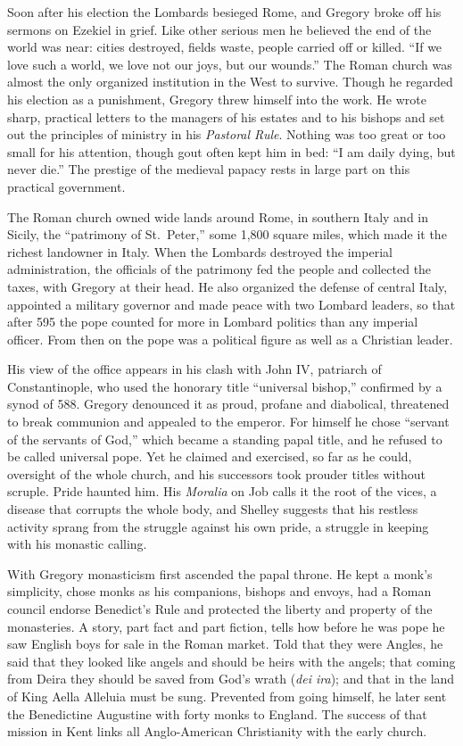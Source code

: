 Soon after his election the Lombards besieged Rome, and Gregory broke off his sermons on Ezekiel in
grief. Like other serious men he believed the end of the world was near: cities destroyed, fields
waste, people carried off or killed. ``If we love such a world, we love not our joys, but our
wounds.'' The Roman church was almost the only organized institution in the West to survive. Though he
regarded his election as a punishment, Gregory threw himself into the work. He wrote sharp, practical
letters to the managers of his estates and to his bishops and set out the principles of ministry in
his \emph{Pastoral Rule}. Nothing was too great or too small for his attention, though gout often
kept him in bed: ``I am daily dying, but never die.'' The prestige of the medieval papacy rests in
large part on this practical government.

The Roman church owned wide lands around Rome, in southern Italy and in Sicily, the ``patrimony of
St.~Peter,'' some 1,800 square miles, which made it the richest landowner in Italy. When the Lombards
destroyed the imperial administration, the officials of the patrimony fed the people and collected
the taxes, with Gregory at their head. He also organized the defense of central Italy, appointed a
military governor and made peace with two Lombard leaders, so that after 595 the pope counted for
more in Lombard politics than any imperial officer. From then on the pope was a political figure as
well as a Christian leader.

His view of the office appears in his clash with John IV, patriarch of Constantinople, who used the
honorary title ``universal bishop,'' confirmed by a synod of 588. Gregory denounced it as proud,
profane and diabolical, threatened to break communion and appealed to the emperor. For himself he
chose ``servant of the servants of God,'' which became a standing papal title, and he refused to be
called universal pope. Yet he claimed and exercised, so far as he could, oversight of the whole
church, and his successors took prouder titles without scruple. Pride haunted him. His \emph{Moralia}
on Job calls it the root of the vices, a disease that corrupts the whole body, and Shelley suggests
that his restless activity sprang from the struggle against his own pride, a struggle in keeping with
his monastic calling.

With Gregory monasticism first ascended the papal throne. He kept a monk's simplicity, chose monks as his companions, bishops and envoys, had a Roman council endorse Benedict's Rule and
protected the liberty and property of the monasteries. A story, part fact and part fiction, tells how
before he was pope he saw English boys for sale in the Roman market. Told that they were Angles, he
said that they looked like angels and should be heirs with the angels; that coming from Deira they
should be saved from God's wrath (\emph{dei ira}); and that in the land of King Aella Alleluia must be
sung. Prevented from going himself, he later sent the Benedictine Augustine with forty monks to
England. The success of that mission in Kent links all Anglo-American Christianity with the early
church.


